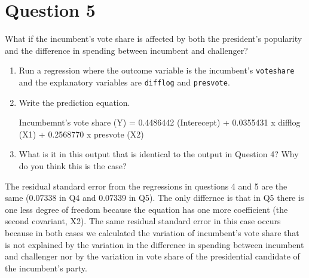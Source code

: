 \documentclass[12pt,letterpaper]{article}
\begin{document}
\section*{Question 5}%
\noindent What if the incumbent's vote share is affected by both the president's popularity and the difference in spending between incumbent and challenger? 
	\begin{enumerate}
		\item Run a regression where the outcome variable is the incumbent's \texttt{voteshare} and the explanatory variables are \texttt{difflog} and \texttt{presvote}.
		 	
				
		\item Write the prediction equation.
				
\vspace{.5cm}			
		Incumbemnt's vote share (Y) = 0.4486442 (Interecept) + 0.0355431 x difflog (X1) + 0.2568770 x presvote (X2)		
		
		\item What is it in this output that is identical to the output in Question 4? Why do you think this is the case?%
	\end{enumerate}
	The residual standard error from the regressions in questions 4 and 5 are the same (0.07338 in Q4 and 0.07339 in Q5). The only differnce is that in Q5 there is one less degree of freedom because the equation has one more coefficient (the second covariant, X2).
	The same residual standard error in this case occurs because in both cases we calculated the variation of incumbent's vote share that is not explained by the variation in the difference in spending between incumbent and challenger nor by the variation in vote share of the presidential candidate of the incumbent's party.
\end{document}
